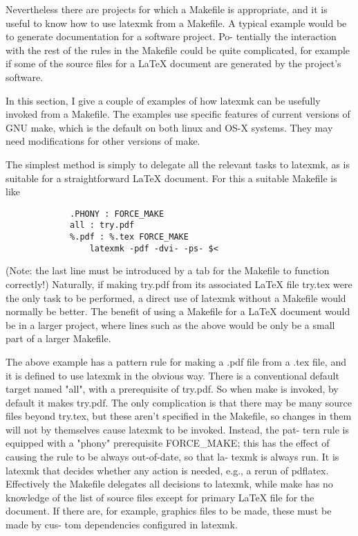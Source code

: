 Nevertheless there are projects for which a  Makefile  is  appropriate,
and it is useful to know how to use latexmk from a Makefile.  A typical
example would be to generate documentation for a software project.  Po-
tentially  the  interaction  with the rest of the rules in the Makefile
could be quite complicated, for example if some of the source files for
a LaTeX document are generated by the project's software.

In this section, I give a couple of examples of how latexmk can be usefully
invoked from a Makefile.  The examples use specific  features  of current
versions  of  GNU make, which is the default on both linux and OS-X systems.
They may need modifications for other versions of make.

The simplest method is simply to delegate all the relevant tasks to latexmk, as
is suitable for a straightforward LaTeX document.  For this a suitable Makefile
is like

\begin{verbatim}
             .PHONY : FORCE_MAKE
             all : try.pdf
             %.pdf : %.tex FORCE_MAKE
                 latexmk -pdf -dvi- -ps- $<
\end{verbatim}

(Note: the last line must be introduced by a tab for  the  Makefile  to
function  correctly!)  Naturally, if making try.pdf from its associated
LaTeX file try.tex were the only task to be performed, a direct use  of
latexmk  without  a  Makefile would normally be better.  The benefit of
using a Makefile for a LaTeX document would be  in  a  larger  project,
where lines such as the above would be only be a small part of a larger
Makefile.

The above example has a pattern rule for making a .pdf file from a .tex
file,  and it is defined to use latexmk in the obvious way.  There is a
conventional  default  target  named  "all",  with  a  prerequisite  of
try.pdf.   So  when  make is invoked, by default it makes try.pdf.  The
only complication is  that  there  may  be  many  source  files  beyond
try.tex, but these aren't specified in the Makefile, so changes in them
will not by themselves cause latexmk to be invoked.  Instead, the  pat-
tern  rule is equipped with a "phony" prerequisite FORCE_MAKE; this has
the effect of causing the rule to be always out-of-date,  so  that  la-
texmk  is always run.  It is latexmk that decides whether any action is
needed, e.g., a rerun of pdflatex.  Effectively the Makefile  delegates
all  decisions  to  latexmk, while make has no knowledge of the list of
source files except for primary LaTeX file for the  document.  If there
are, for example, graphics files to be made, these must be made by cus-
tom dependencies configured in latexmk.


